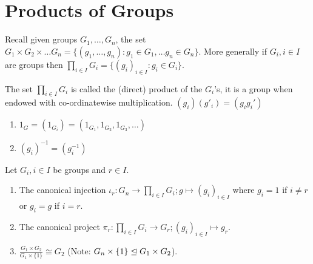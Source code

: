 \section{Products of Groups}

Recall given groups \(G_1, \dots, G_n\), the set \(G_1 \times G_2 \times \dots G_n = \{(g_1, \dots, g_n): g_1 \in G_1, \dots g_n \in G_n \}\). More generally if \(G_i, i \in I\) are groups then \(\prod_{i\in I} G_i = \{(g_i)_{i \in I}: g_i \in G_i\}\).

\begin{prop-defn}[Product]
The set \(\prod_{i \in I}  G_i\) is called the (direct) product of the \(G_i\)'s, it is a group when endowed with co-ordinatewise multiplication. \((g_i)(g'_i) = (g_ig_i')\)
\begin{enumerate}
    \item \(1_G = (1_{G_i}) = (1_{G_1}, 1_{G_2}, 1_{G_3}, \dots)\)
    \item \((g_i)^{-1} = (g_i^{-1})\)
\end{enumerate}
\end{prop-defn}


\begin{proposition}
    Let \(G_i, i \in I\) be groups and \(r \in I\).
    \begin{enumerate}
        \item The canonical injection \(\iota_r : G_n \to \prod_{i \in I}G_i; g \mapsto (g_i)_{i \in I}\) where \(g_i = 1\) if \(i \neq r\) or \(g_i = g\) if \(i = r\).
        \item The canonical project \(\pi_r: \prod_{i \in I} G_i \to G_r; (g_i)_{i \in I} \mapsto g_r\).
        \item \(\frac{G_1 \times G_2}{G_1 \times \{1\}} \cong G_2\) (Note: \(G_n \times \{1\} \trianglelefteq G_1 \times G_2\)).
    \end{enumerate}
\end{proposition}

